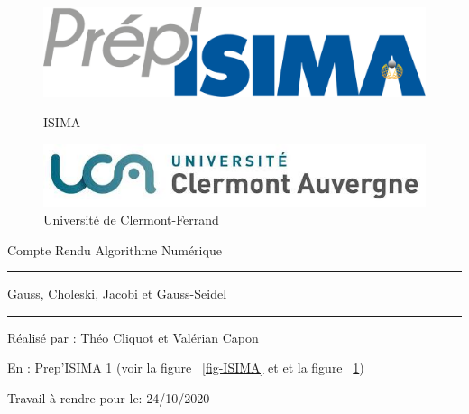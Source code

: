 \documentclass[12pt]{article}
\begin{document}
\begin{figure}[!htb]
  \begin{minipage}{0.5\textwidth}
    \centering
    \includegraphics[width=.7\linewidth]{./img/prepisima.png}
    \caption{ ISIMA }\label{fig-ISIMA}
  \end{minipage}\hfill
  \begin{minipage}{0.5\textwidth}
    \centering
    \includegraphics[width=.7\linewidth]{img/UCA.jpeg}
    \caption{Université de Clermont-Ferrand}\label{fig-UCA}
  \end{minipage}
\end{figure}



\vspace{5cm}
\begin{center}


  \color{red} {\fontsize{50}{60}\selectfont  Compte Rendu Algorithme Numérique}

  \vspace{0.5cm}
  \color{gray}
  \rule{0.6\linewidth}{1mm}

  \vspace{0.5cm}
  
  \color{red} {\huge Gauss, Choleski, Jacobi et Gauss-Seidel}

  \color{gray}
  \rule{0.6\linewidth}{1mm}
  
  \vspace{0.5cm}

  \color{black}
  Réalisé par : Théo Cliquot et Valérian Capon
  
  \vspace{0.5cm}
  
  En : Prep'ISIMA 1 (voir la figure ~\ref{fig-ISIMA} et et la figure ~\ref{fig-UCA})

  \vspace{0.5cm}
  
  Travail à rendre pour le: 24/10/2020
  
  \newpage

  \doublespacing
  \color{blue}
  \tableofcontents
  \listoffigures
  \color{black}
  \doublespacing
  \vspace{2.5cm}

\end{center}
\end{document}
